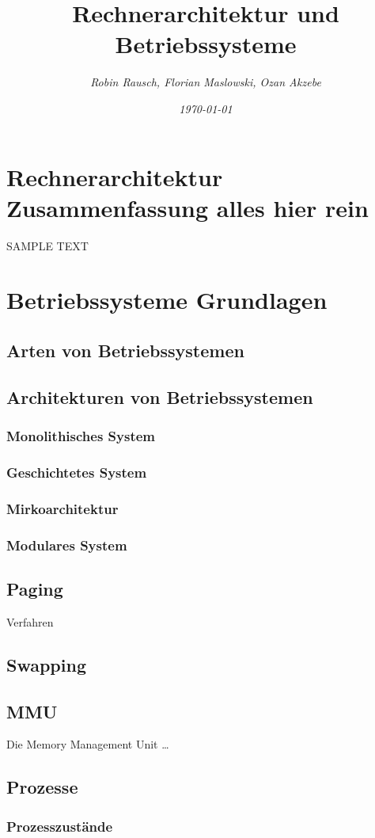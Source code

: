 \documentclass[12pt,a4paper]{article}
\author{\slshape Robin Rausch, Florian Maslowski, Ozan Akzebe}
\title{Rechnerarchitektur und Betriebssysteme}
\date{\slshape \today}
\begin{document}
\maketitle
\tableofcontents
\newpage
\section{Rechnerarchitektur Zusammenfassung alles hier rein}
SAMPLE TEXT 
\section{Betriebssysteme Grundlagen}
\subsection{Arten von Betriebssystemen}

\subsection{Architekturen von Betriebssystemen}
\subsubsection{Monolithisches System}

\subsubsection{Geschichtetes System}

\subsubsection{Mirkoarchitektur}

\subsubsection{Modulares System}

\subsection{Paging}
Verfahren

\subsection{Swapping}

\subsection{MMU}
Die Memory Management Unit \dots

\subsection{Prozesse}
\subsubsection{Prozesszustände}
\end{document}
